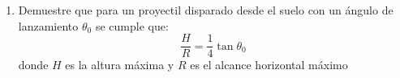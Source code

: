 \documentclass[letterpaper,11pt]{article}
\begin{document}
\begin{enumerate}
\item Demuestre que para un proyectil disparado desde el suelo con un ángulo de lanzamiento \(\theta_0\) se cumple que:
\[\frac{H}{R} = \frac{1}{4}\tan{\theta_0}\]
donde $H$ es la altura máxima y $R$ es el alcance horizontal máximo


%   

\end{enumerate}
\end{document}
